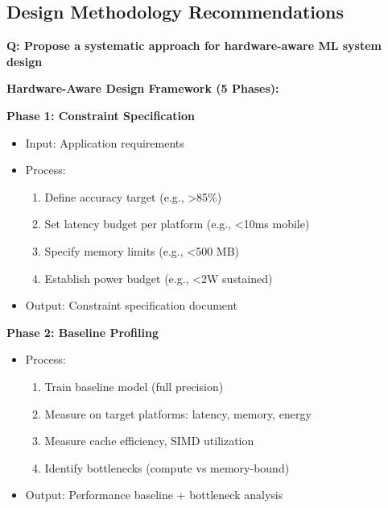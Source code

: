 \documentclass[10pt, a4paper]{article}
\begin{document}
\subsection{Design Methodology Recommendations}

\textbf{Q: Propose a systematic approach for hardware-aware ML system design}

\textbf{Hardware-Aware Design Framework (5 Phases):}

\textbf{Phase 1: Constraint Specification}
\begin{itemize}
    \item Input: Application requirements
    \item Process:
    \begin{enumerate}
        \item Define accuracy target (e.g., >85\%)
        \item Set latency budget per platform (e.g., <10ms mobile)
        \item Specify memory limits (e.g., <500 MB)
        \item Establish power budget (e.g., <2W sustained)
    \end{enumerate}
    \item Output: Constraint specification document
\end{itemize}

\textbf{Phase 2: Baseline Profiling}
\begin{itemize}
    \item Process:
    \begin{enumerate}
        \item Train baseline model (full precision)
        \item Measure on target platforms: latency, memory, energy
        \item Measure cache efficiency, SIMD utilization
        \item Identify bottlenecks (compute vs memory-bound)
    \end{enumerate}
    \item Output: Performance baseline + bottleneck analysis
\end{itemize}
\end{document}
